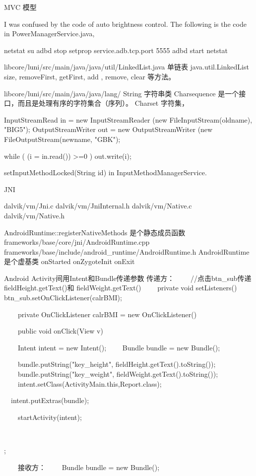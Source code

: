 \documentclass{book}
\begin{document}
\begin{CJK}{UTF8}{gbsn}
{MVC 模型

I was confused by the code of auto brightness control.
The following is the code in PowerManagerService.java,


netstat
su
adbd stop
setprop service.adb.tcp.port 5555
adbd start
netstat


libcore/luni/src/main/java/java/util/LinkedList.java  单链表
java.util.LinkedList     size,  removeFirst,  getFirst,   add , remove,  clear 等方法。


libcore/luni/src/main/java/java/lang/   String  字符串类
                                       Charsequence
                                       是一个接口，而且是处理有序的字符集合（序列）。
                                       Charset  字符集，


InputStreamRead in = new InputStreamReader (new FileInputStream(oldname),
                                            "BIG5");
OutputStreamWriter out = new OutputStreamWriter (new FileOutputStream(newname,
"GBK");

while ( (i = in.read()) >=0 )
    out.write(i);




setInputMethodLocked(String id) in InputMethodManagerService.


JNI

dalvik/vm/Jni.c
dalvik/vm/JniInternal.h
dalvik/vm/Native.c
dalvik/vm/Native.h


AndroidRuntime::registerNativeMethods 是个静态成员函数
frameworks/base/core/jni/AndroidRuntime.cpp
frameworks/base/include/android_runtime/AndroidRuntime.h   
AndroidRuntime 是个虚基类
onStarted
onZygoteInit
onExit



Android Activity间用Intent和Bundle传递参数
传递方：
　　//点击btn_sub传递 fieldHeight.getText()和 fieldWeight.getText()
　　private void setListeners(){
　　btn_sub.setOnClickListener(calrBMI);
　　}

　　private OnClickListener calrBMI = new OnClickListener()　　{
　　public void onClick(View v)　{
　　Intent intent = new Intent();
　　Bundle bundle = new Bundle();

　　bundle.putString("key_height", fieldHeight.getText().toString());
　　bundle.putString("key_weight", fieldWeight.getText().toString());
　　intent.setClass(ActivityMain.this,Report.class);

  　intent.putExtras(bundle);

　　startActivity(intent);
　　}
　　};

　　接收方：
　　Bundle bundle = new Bundle();

}
\end{CJK}
\end{document}
